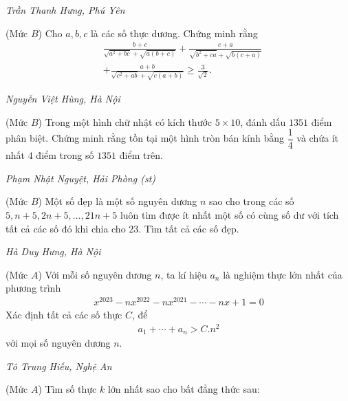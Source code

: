 \begin{multicols}{2}
\begin{figure}[H]
\begin{tikzpicture}[thachthuctoanhoc]
		\end{tikzpicture}
		\vspace*{-10pt}
	\end{figure}
	\begin{flushright}
		\textit{Trần Thanh Hưng, Phú Yên}
	\end{flushright}
	{}
	(Mức $B$) Cho $a, b, c$ là các số thực dương. Chứng minh rằng
	\begin{align*}
		&\frac{b+c}{\sqrt{\!a^2\!+\!b c}\!+\!\!\sqrt{\!a(b+c)}}\!+\!\frac{c\!+\!a}{\sqrt{\!b^2\!+\!c a}\!+\!\!\sqrt{\!b(c\!+\!a)}}\\
		&+\frac{a+b}{\sqrt{c^2+a b}+\sqrt{c(a+b)}} \geq \frac{3}{\sqrt{2}} .
	\end{align*}
	\begin{flushright}
		\textit{Nguyễn Việt Hùng, Hà Nội}
	\end{flushright}
	{}
	(Mức $B$) Trong một hình chữ nhật có kích thước $5\times 10$, đánh dấu $1351$ điểm phân biệt. Chứng minh rằng tồn tại một hình tròn bán kính bằng $\dfrac14$ và chứa ít nhất $4$ điểm trong số $1351$ điểm trên. 
	\begin{flushright}
		\textit{Phạm Nhật Nguyệt, Hải Phòng (st)}
	\end{flushright}
	{}
	(Mức $B$) Một số đẹp là một số nguyên dương $n$ sao cho  trong các số $5,n+5,2n+5,\ldots,21n+5$ luôn tìm được ít nhất một số có cùng số dư với tích tất cả các số đó khi chia cho $23$. Tìm tất cả các số đẹp.
	\begin{flushright}
		\textit{Hà Duy Hưng, Hà Nội}
	\end{flushright}
	{}
	(Mức $A$) Với mỗi số nguyên dương $n$, ta kí hiệu $a_n$ là nghiệm thực lớn nhất của phương trình
	\begin{align*}
		x^{2023}-nx^{2022}-nx^{2021}-\cdots-nx+1=0
	\end{align*}
	Xác định tất cả các số thực $C$, để 
	\begin{align*}
		a_1+\cdots+a_n>C. n^2
	\end{align*}
	với mọi số nguyên dương $n$.
	\begin{flushright}
		\textit{Tô Trung Hiếu, Nghệ An}
	\end{flushright}
	{}
	(Mức $A$) Tìm số thực $k$ lớn nhất sao cho bất đẳng thức sau: 
	\begin{align*}

\end{align*}
\end{multicols}
